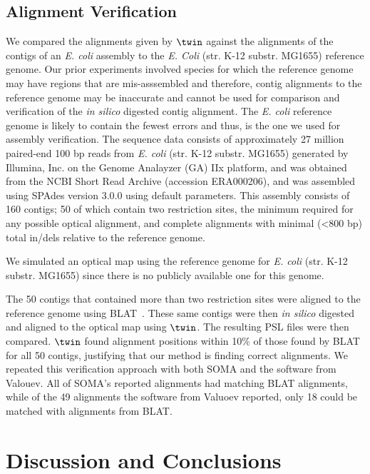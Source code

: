 \documentclass[doctor]{thesis}
\begin{document}
 

\subsection{Alignment Verification} \label{sec:ecoli}

We compared the alignments given by $\twin$ against the alignments of the contigs of an {\em E. coli} assembly to the \emph{E. Coli} (str. K-12 substr. MG1655) reference genome.  Our prior experiments involved species for which the reference genome may have regions that are mis-asssembled and therefore, contig alignments to the reference genome may be inaccurate and cannot be used for comparison and verification of the {\em in silico} digested contig alignment.   The {\em E. coli} reference genome is likely to contain the fewest errors and thus, is the one we used for assembly verification.  The sequence data consists of approximately 27 million paired-end 100 bp reads from {\em E. coli} (str. K-12 substr. MG1655) generated by Illumina, Inc. on the Genome Analayzer (GA) IIx platform, and  was obtained from the NCBI Short Read Archive (accession ERA000206), and was assembled using SPAdes version 3.0.0 \cite{spades} using default parameters.  This assembly consists of 160 contigs; 50 of which contain two restriction sites, the minimum required for any possible optical alignment, and complete alignments with minimal (\textless 800 bp) total in/dels relative to the reference genome.

We simulated an optical map using the reference genome for {\em E. coli} (str. K-12 substr. MG1655) since there is no publicly available one for this genome.  

The 50 contigs that contained more than two restriction sites were aligned to the reference genome using BLAT~\cite{blat}.  These same contigs were then {\em in silico} digested and aligned to the optical map using $\twin$.  The resulting PSL files were then compared.  $\twin$ found alignment positions within 10\% of those found by BLAT for all 50 contigs, justifying that our method is finding correct alignments.  We repeated this verification approach with both SOMA and the software from Valouev.  All of SOMA's reported alignments had matching BLAT alignments, while of the 49 alignments the software from Valuoev reported, only 18 could be matched with alignments from BLAT.
 
\makeatletter{}\section{Discussion and Conclusions}
\label{sec-discussion}
\end{document}
